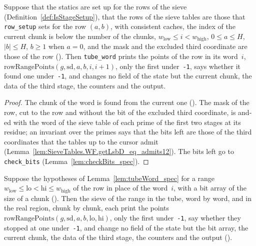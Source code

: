 \begin{lemma}\label{lem:tubeWord_spec}
  \leanok
  Suppose that the statics are set up for the rows of the sieve (Definition~\ref{def:IsStageSetup}),
  that the rows of the sieve tables are those that \texttt{row\_setup} sets for the row $(a, b)$,
  with consistent caches, the index of the current chunk is below the number of the
  chunks, $w_{\mathrm{low}} \le i < w_{\mathrm{high}}$, $0 \le a \le H$, $|b| \le H$, $b \ge 1$ when $a = 0$,
  and the mask and the excluded third coordinate are those of the row
  (). Then \texttt{tube\_word} prints the points of the row in its
  word~$i$, $\mathrm{rowRangePoints}(g, \mathrm{sd}, a, b, i, i + 1)$, only the first
  under~\texttt{-1}, says whether it found one under~\texttt{-1}, and changes no field of the state
  but the current chunk, the data of the third stage, the counters and the output.
\end{lemma}

\begin{proof}
  \leanok
  The chunk of the word is found from the current one (). The mask
  of the row, cut to the row and without the bit of the excluded third coordinate, is and-ed with
  the word of the sieve table of each prime of the first two stages at its residue; an invariant
  over the primes says that the bits left are those of the third coordinates that the tables up to
  the cursor admit (Lemma~\ref{lem:SieveTables.WF.getLsbD_eq_admits12}). The bits left go to
  \texttt{check\_bits} (Lemma~\ref{lem:checkBits_spec}).
\end{proof}

\begin{lemma}\label{lem:siftBandsTube_spec}
  \leanok
  Suppose the hypotheses of Lemma~\ref{lem:tubeWord_spec} for a range $w_{\mathrm{low}} \le
  \mathrm{lo} < \mathrm{hi} \le w_{\mathrm{high}}$ of the row in place of the word~$i$, with a bit
  array of the size of a chunk (). Then the sieve of the range in the
  tube, word by word, and in the real region, chunk by chunk, each print the points
  $\mathrm{rowRangePoints}(g, \mathrm{sd}, a, b, \mathrm{lo}, \mathrm{hi})$, only the first
  under~\texttt{-1}, say whether they stopped at one under~\texttt{-1}, and change no field of the
  state but the bit array, the current chunk, the data of the third stage, the counters and the
  output ().
\end{lemma}

